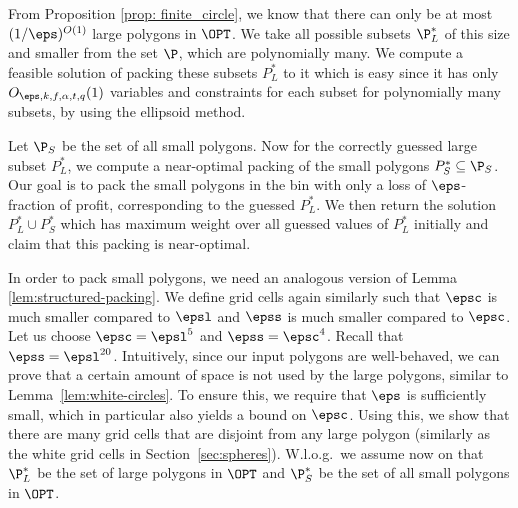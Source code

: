 \documentclass[10pt,a4paper]{article}
\theoremstyle{plain}
\theoremstyle{plain}
\theoremstyle{plain}
\theoremstyle{definition}
\def\rem#1{{\marginpar{\raggedright\scriptsize #1}}}
\newcommand{\awr}[1]{\rem{\textcolor{orange}{$\bullet$ #1}}}
\begin{document}
{\begin{itemize}
\end{itemize}

From Proposition \ref{prop: finite_circle}, we know that there can only be at most $(1/\eps)^{O(1)}$
large polygons in $\OPT$. We take all possible subsets $\P_L ^*$ of this size and smaller from the set $\P$, which are polynomially many.
We compute a feasible solution of packing these subsets $P_L ^*$ to it which is easy since it has only
$O_{\eps, k, f, \alpha, t, q}(1)$ variables and constraints for each subset for polynomially many subsets, by using the ellipsoid method.

Let $\P_{S}$ be the set of all small polygons. 
Now for the correctly guessed large subset $P_L ^*$, we compute a near-optimal packing of the small polygons $P_S^* \subseteq \P_{S}$. Our goal is to pack the small polygons in the bin with only a loss of $\eps$-fraction of profit, corresponding to the guessed $P_L^*$. We then return the solution $P_L^* \cup P_S^*$ which has maximum weight over all guessed values of $P_L^*$ initially and claim that this packing is near-optimal.

In order to pack small polygons, we need an analogous version of Lemma \ref{lem:structured-packing}.
We define grid cells again similarly such that $\epsc$ is much smaller compared to $\epsl$ and $\epss$ is much smaller compared to $\epsc$.
Let us choose $\epsc= \epsl^{5}$ and $\epss=\epsc^{4}$. Recall that $\epss = \epsl^{20}$.
{Intuitively, since our input polygons are well-behaved, we can prove that a certain amount of space is not used by the large polygons, similar to Lemma~\ref{lem:white-circles}.} To ensure this, we require that $\eps$ is sufficiently small, which in particular also yields a bound on $\epsc$. Using this, we show that there are many grid cells that are disjoint from any large polygon (similarly as the white grid cells in Section~\ref{sec:spheres}).
W.l.o.g.~we assume now on that $\P_{L}^{*}$ be the set of large polygons in $\OPT$ and $\P_{S}^{*}$ be the set of all small polygons in $\OPT$.

}
\end{document}
